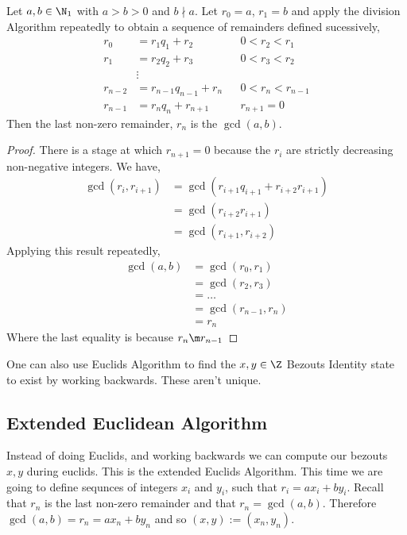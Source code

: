 \begin{nthm}
  Let $a, b \in \N_1$ with $a > b > 0$ and $b \nmid a$. Let $r_0 = a$, $r_1 = b$ and apply the division Algorithm repeatedly to obtain a sequence of remainders defined sucessively,
  \begin{align*}
    r_0 &= r_1q_1 + r_2 && 0 < r_2 < r_1\\
    r_1 &= r_2q_2 + r_3 && 0 < r_3 < r_2\\
    &\vdots\\
    r_{n-2} &= r_{n-1}q_{n-1} + r_n && 0 < r_{n} < r_{n-1}\\
    r_{n-1} &= r_nq_n + r_{n+1} && r_{n+1}=0
  \end{align*}
  Then the last non-zero remainder, $r_n$ is the $\gcd(a, b)$.
\end{nthm}

\begin{proof}
  There is a stage at which $r_{n+1} = 0$ because the $r_i$ are strictly decreasing non-negative integers. We have,
  \begin{align*}
    \gcd(r_i, r_{i+1}) &= \gcd(r_{i+1}q_{i+1} + r_{i+2}r_{i+1})\\
    &= \gcd(r_{i+2}r_{i+1}) \\
    &= \gcd(r_{i+1}, r_{i+2})
  \end{align*}
  Applying this result repeatedly,
  \begin{align*}
    \gcd(a, b) &= \gcd(r_0, r_1)\\
    &= \gcd(r_2, r_3)\\
    &= \dots\\
    &= \gcd(r_{n-1}, r_n)\\
    &= r_n
  \end{align*}
  Where the last equality is because $r_n \m r_{n-1}$
\end{proof}

\begin{remark}
   One can also use Euclids Algorithm to find the $x, y\in \Z$ Bezouts Identity state to exist by working backwards. These aren't unique.
\end{remark}

\subsection{Extended Euclidean Algorithm}

Instead of doing Euclids, and working backwards we can compute our bezouts $x, y$ during euclids. This is the extended Euclids Algorithm. This time we are going to define sequnces of integers $x_i$ and $y_i$, such that $r_i = ax_i + by_i$. Recall that $r_n$ is the last non-zero remainder and that $r_n = \gcd(a, b)$. Therefore $\gcd(a, b) = r_n = ax_n + by_n$ and so $(x, y) := (x_n, y_n)$.\\

